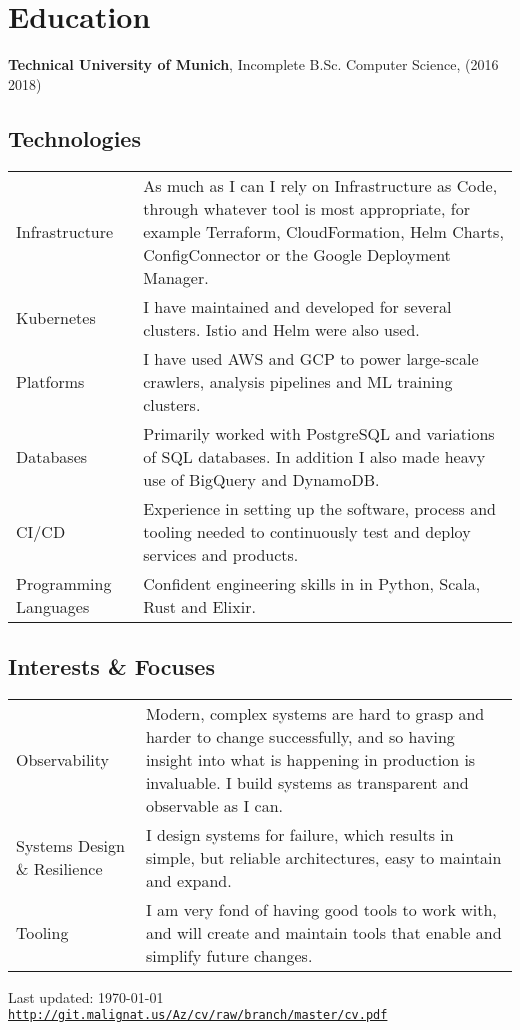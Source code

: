\documentclass[a4paper]{article}
\def\footerlink{http://git.malignat.us/Az/cv/raw/branch/master/cv.pdf}
\renewenvironment{itemize}{
  \begin{list}{}{
      \setlength{\leftmargin}{1.5em}
      \setlength{\itemsep}{5pt}
  }
}{
  \end{list}
}
\begin{document}
\section*{Education}

\begin{itemize}
  \item \textbf{Technical University of Munich}, Incomplete B.Sc. Computer Science,  (2016
    {\textendash} 2018)
\end{itemize}

\subsection*{Technologies}
\begin{tabular}{ p{2.75cm} | p{14cm} }
  Infrastructure & As much as I can I rely on Infrastructure as Code, through
                   whatever tool is most appropriate, for example Terraform,
                   CloudFormation, Helm Charts, ConfigConnector or the Google
                   Deployment Manager. \\
  Kubernetes & I have maintained and developed for several clusters. Istio and
               Helm were also used.\\
  Platforms & I have used AWS and GCP to power large-scale crawlers, analysis pipelines and ML
              training clusters. \\
  Databases & Primarily worked with PostgreSQL and variations of SQL
              databases. In addition I also made heavy use of BigQuery and DynamoDB.\\
  CI/CD & Experience in setting up the software, process and tooling needed
          to continuously test and deploy services and products.\\
  Programming Languages & Confident engineering skills in in Python, Scala, Rust and Elixir.
\end{tabular}

\subsection*{Interests \& Focuses}
\begin{tabular}{ p{2.75cm} | p{14cm} }
  Observability & Modern, complex systems are hard to grasp and harder to change
                  successfully, and so having insight into what is happening in production is
                  invaluable. I build systems as transparent and observable as I
                  can. \\
  Systems Design \& Resilience & I design systems for failure, which results in simple,
                                 but reliable architectures, easy to maintain and expand.\\
  Tooling & I am very fond of having good tools to work with, and will create and
            maintain tools that enable and simplify future changes. \\
\end{tabular}

\vfill

\begin{center}
  \begin{footnotesize}
    Last updated: \today \\
    \href{\footerlink}{\texttt{\footerlink}}
  \end{footnotesize}
\end{center}
\end{document}
